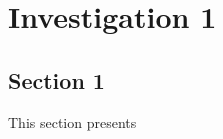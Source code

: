 \chapter{Investigation 1}	
\label{chapter3}

\section{Section 1}

\begin{paragraph}
This section presents
\end{paragraph}
